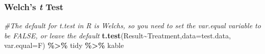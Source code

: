 \documentclass[
]{article}
\newenvironment{Shaded}{\begin{snugshade}}{\end{snugshade}}
\newcommand{\AttributeTok}[1]{\textcolor[rgb]{0.13,0.29,0.53}{#1}}
\newcommand{\CommentTok}[1]{\textcolor[rgb]{0.56,0.35,0.01}{\textit{#1}}}
\newcommand{\FunctionTok}[1]{\textcolor[rgb]{0.13,0.29,0.53}{\textbf{#1}}}
\newcommand{\NormalTok}[1]{#1}
\newcommand{\SpecialCharTok}[1]{\textcolor[rgb]{0.81,0.36,0.00}{\textbf{#1}}}
\begin{document}
\subsubsection{\texorpdfstring{Welch's \emph{t}
Test}{Welch's t Test}}\label{welchs-t-test}

\begin{Shaded}
\begin{Highlighting}[]
\CommentTok{\#The default for t.test in R is Welch\textquotesingle{}s, so you need to set the var.equal variable to be FALSE, or leave the default}
\FunctionTok{t.test}\NormalTok{(Result}\SpecialCharTok{\textasciitilde{}}\NormalTok{Treatment,}\AttributeTok{data=}\NormalTok{test.data, }\AttributeTok{var.equal=}\NormalTok{F) }\SpecialCharTok{\%\textgreater{}\%}\NormalTok{ tidy }\SpecialCharTok{\%\textgreater{}\%}\NormalTok{ kable}
\end{Highlighting}
\end{Shaded}
\end{document}
